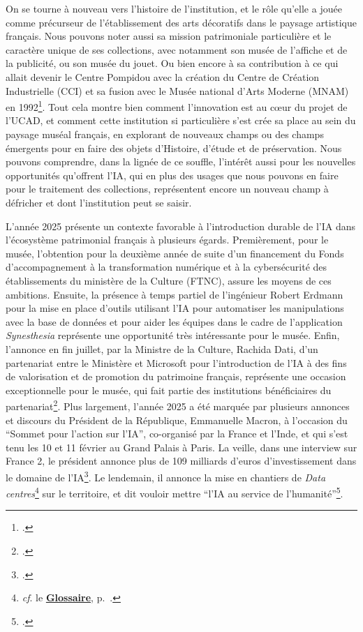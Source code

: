 On se tourne à nouveau vers l'histoire de l'institution, et le rôle qu'elle a jouée comme précurseur de l'établissement des arts décoratifs dans le paysage artistique français. Nous pouvons noter aussi sa mission patrimoniale particulière et le caractère unique de ses collections, avec notamment son musée de l'affiche et de la publicité, ou son musée du jouet. Ou bien encore à sa contribution à ce qui allait devenir le Centre Pompidou avec la création du Centre de Création Industrielle (CCI) et sa fusion avec le Musée national d'Arts Moderne (MNAM) en 1992\footnote{\cite{caroll_centre_nodate}.}. Tout cela montre bien comment l'innovation est au cœur du projet de l'UCAD, et comment cette institution si particulière s'est crée sa place au sein du paysage muséal français, en explorant de nouveaux champs ou des champs émergents pour en faire des objets d'Histoire, d'étude et de préservation. Nous pouvons comprendre, dans la lignée de ce souffle, l'intérêt aussi pour les nouvelles opportunités qu'offrent l'IA, qui en plus des usages que nous pouvons en faire pour le traitement des collections, représentent encore un nouveau champ à défricher et dont l'institution peut se saisir.

L'année 2025 présente un contexte favorable à l'introduction durable de l'IA dans l'écosystème patrimonial français à plusieurs égards. Premièrement, pour le musée, l'obtention pour la deuxième année de suite d'un financement du Fonds d’accompagnement à la transformation numérique et à la cybersécurité des établissements du ministère de la Culture (FTNC), assure les moyens de ces ambitions. Ensuite, la présence à temps partiel de l'ingénieur Robert Erdmann pour la mise en place d'outils utilisant l'IA pour automatiser les manipulations avec la base de données et pour aider les équipes dans le cadre de l'application \textit{Synesthesia} représente une opportunité très intéressante pour le musée. Enfin, l'annonce en fin juillet, par la Ministre de la Culture, Rachida Dati, d'un partenariat entre le Ministère et Microsoft pour l'introduction de l'IA à des fins de valorisation et de promotion du patrimoine français, représente une occasion exceptionnelle pour le musée, qui fait partie des institutions bénéficiaires du partenariat\footnote{\cite{noauthor_discours_2025}.}. Plus largement, l'année 2025 a été marquée par plusieurs annonces et discours du Président de la République, Emmanuelle Macron, à l'occasion du \enquote{Sommet pour l'action sur l'IA}, co-organisé par la France et l'Inde, et qui s'est tenu les 10 et 11 février au Grand Palais à Paris. La veille, dans une interview sur France 2, le président annonce plus de 109 milliards d'euros d'investissement dans le domaine de l'IA\footnote{\cite{noauthor_replay_2025}.}. Le lendemain, il annonce la mise en chantiers de \textit{Data centres}\footnote{\textit{cf}. le \textbf{\hyperref[sec:Glossaire]{Glossaire}}, p.~\pageref{sec:Glossaire}.} sur le territoire, et dit vouloir mettre \enquote{l'IA au service de l'humanité}\footnote{\cite{noauthor_prononce_2025}.}. 

